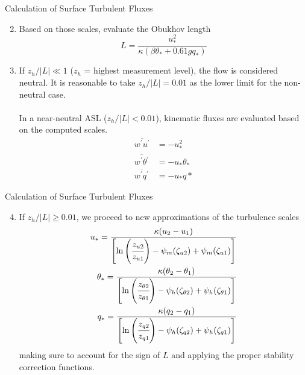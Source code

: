 \begin{frame}{Calculation of Surface Turbulent Fluxes}
\begin{enumerate}
\setcounter{enumi}{1}
	\item Based on those scales, evaluate the Obukhov length
	$$L = \frac{u_*^2}{\kappa(\beta \theta_* + 0.61 g q_*)}$$
	\item If $z_h/|L|\ll 1$ ($z_h$ = highest measurement level), the flow is considered neutral. It is reasonable to take $z_h/|L|=0.01$ as the lower limit for the non-neutral case. ~\\~\\In a near-neutral ASL ($z_h/|L|<0.01$), kinematic fluxes are evaluated based on the computed scales.
	\begin{align*}
		\overline{w^\prime u^\prime} &= -u_*^2\\
		\overline{w^\prime \theta^\prime} &= -u_*\theta_*\\
		\overline{w^\prime q^\prime} &= -u_*q*
	\end{align*}
\end{enumerate}
\end{frame}
\begin{frame}{Calculation of Surface Turbulent Fluxes}
\begin{enumerate}
\setcounter{enumi}{3}
	\item \label{itm:four} If $z_h/|L|\geq 0.01$, we proceed to new approximations of the turbulence scales
	\begin{align*}
		u_* = \frac{\kappa(u_2 - u_1)}{\left[\ln \left(\cfrac{z_{u2}}{z_{u1}}\right) - \psi_m(\zeta_{u2}) + \psi_m(\zeta_{u1})\right]}\\
		\theta_* = \frac{\kappa(\theta_2 - \theta_1)}{\left[\ln \left(\cfrac{z_{\theta 2}}{z_{\theta 1}}\right) - \psi_h(\zeta_{\theta 2}) + \psi_h(\zeta_{\theta 1})\right]}\\
		q_* = \frac{\kappa(q_2 - q_1)}{\left[\ln \left(\cfrac{z_{q2}}{z_{q1}}\right) - \psi_h(\zeta_{q2}) + \psi_h(\zeta_{q1})\right]}\\
	\end{align*}
	making sure to account for the sign of $L$ and applying the proper stability correction functions.
\end{enumerate}
\end{frame}
